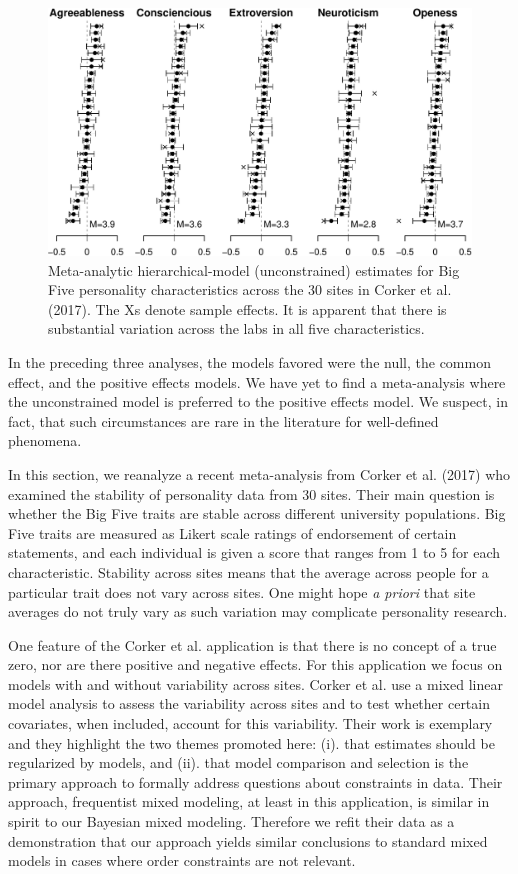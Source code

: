 \documentclass[english,man]{apa6}
\theoremstyle{definition}
\theoremstyle{definition}
\theoremstyle{definition}
\theoremstyle{remark}
\begin{document}
\begin{figure}[htbp]
\centering
\includegraphics{p_files/figure-latex/corkerEst-1.pdf}
\caption{\label{fig:corkerEst}Meta-analytic hierarchical-model
(unconstrained) estimates for Big Five personality characteristics
across the 30 sites in Corker et al. (2017). The Xs denote sample
effects. It is apparent that there is substantial variation across the
labs in all five characteristics.}
\end{figure}

In the preceding three analyses, the models favored were the null, the
common effect, and the positive effects models. We have yet to find a
meta-analysis where the unconstrained model is preferred to the positive
effects model. We suspect, in fact, that such circumstances are rare in
the literature for well-defined phenomena.

In this section, we reanalyze a recent meta-analysis from Corker et al.
(2017) who examined the stability of personality data from 30 sites.
Their main question is whether the Big Five traits are stable across
different university populations. Big Five traits are measured as Likert
scale ratings of endorsement of certain statements, and each individual
is given a score that ranges from 1 to 5 for each characteristic.
Stability across sites means that the average across people for a
particular trait does not vary across sites. One might hope \emph{a
priori} that site averages do not truly vary as such variation may
complicate personality research.

One feature of the Corker et al. application is that there is no concept
of a true zero, nor are there positive and negative effects. For this
application we focus on models with and without variability across
sites. Corker et al. use a mixed linear model analysis to assess the
variability across sites and to test whether certain covariates, when
included, account for this variability. Their work is exemplary and they
highlight the two themes promoted here: (i). that estimates should be
regularized by models, and (ii). that model comparison and selection is
the primary approach to formally address questions about constraints in
data. Their approach, frequentist mixed modeling, at least in this
application, is similar in spirit to our Bayesian mixed modeling.
Therefore we refit their data as a demonstration that our approach
yields similar conclusions to standard mixed models in cases where order
constraints are not relevant.
\end{document}
